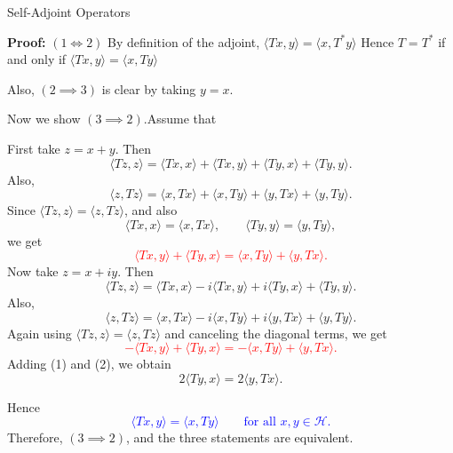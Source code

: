 \documentclass[9pt, aspectratio=169]{beamer}
\begin{document}
\begin{frame}{Self-Adjoint Operators}

{\fontsize{7.5pt}{4pt}\selectfont
\textbf{Proof:} $(1\iff 2)$ By definition of the adjoint,
$
\langle Tx,y\rangle=\langle x,T^*y\rangle 
$
Hence $T=T^*$ if and only if
$
\langle Tx,y\rangle=\langle x,Ty\rangle
$

Also, $(2\implies 3)$ is clear by taking $y=x$.



Now we show $(3\implies 2)$.\pause Assume that

First take $z=x+y$. Then
\[
\langle Tz,z\rangle
=
\langle Tx,x\rangle+\langle Tx,y\rangle+\langle Ty,x\rangle+\langle Ty,y\rangle.
\]
Also,
\[
\langle z,Tz\rangle
=
\langle x,Tx\rangle+\langle x,Ty\rangle+\langle y,Tx\rangle+\langle y,Ty\rangle.
\]
Since $\langle Tz,z\rangle=\langle z,Tz\rangle$, and also
\[
\langle Tx,x\rangle=\langle x,Tx\rangle,\qquad
\langle Ty,y\rangle=\langle y,Ty\rangle,
\]
we get
\textcolor{red}{\[
\langle Tx,y\rangle+\langle Ty,x\rangle
=
\langle x,Ty\rangle+\langle y,Tx\rangle. \tag{1}
\]}
\pause
Now take $z=x+iy$. Then
\[
\langle Tz,z\rangle
=
\langle Tx,x\rangle-i\langle Tx,y\rangle+i\langle Ty,x\rangle+\langle Ty,y\rangle.
\]
Also,
\[
\langle z,Tz\rangle
=
\langle x,Tx\rangle-i\langle x,Ty\rangle+i\langle y,Tx\rangle+\langle y,Ty\rangle.
\]
Again using $\langle Tz,z\rangle=\langle z,Tz\rangle$ and canceling the diagonal terms, we get
\textcolor{red}{\[
-\langle Tx,y\rangle+\langle Ty,x\rangle
=
-\langle x,Ty\rangle+\langle y,Tx\rangle. \tag{2}
\]}
\pause
Adding (1) and (2), we obtain
\[
2\langle Ty,x\rangle=2\langle y,Tx\rangle.
\]

Hence
\textcolor{blue}{
\[
\langle Tx,y\rangle=\langle x,Ty\rangle
\qquad \text{for all }x,y\in\mathcal H.
\]}
Therefore, $(3\implies 2)$, and the three statements are equivalent.}  \square

\end{frame}
\end{document}
